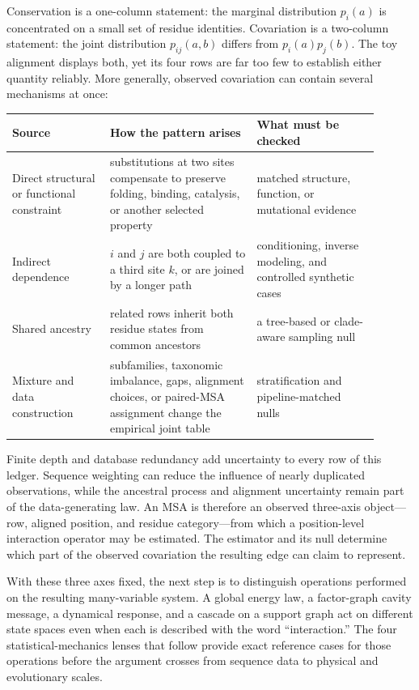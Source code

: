 Conservation is a one-column statement: the marginal distribution $p_i(a)$ is concentrated on a
small set of residue identities.  Covariation is a two-column statement: the joint distribution
$p_{ij}(a,b)$ differs from $p_i(a)p_j(b)$.  The toy alignment displays both, yet its four rows are
far too few to establish either quantity reliably.  More generally, observed covariation can
contain several mechanisms at once:
\begin{center}
\small
\begin{tabular}{@{}>{\raggedright\arraybackslash}p{0.24\linewidth}
                >{\raggedright\arraybackslash}p{0.36\linewidth}
                >{\raggedright\arraybackslash}p{0.30\linewidth}@{}}
\toprule
Source & How the pattern arises & What must be checked \\
\midrule
Direct structural or functional constraint & substitutions at two sites compensate to preserve
folding, binding, catalysis, or another selected property & matched structure, function, or
mutational evidence \\
Indirect dependence & $i$ and $j$ are both coupled to a third site $k$, or are joined by a longer
path & conditioning, inverse modeling, and controlled synthetic cases \\
Shared ancestry & related rows inherit both residue states from common ancestors & a tree-based or
clade-aware sampling null \\
Mixture and data construction & subfamilies, taxonomic imbalance, gaps, alignment choices, or
paired-MSA assignment change the empirical joint table & stratification and pipeline-matched nulls
\\
\bottomrule
\end{tabular}
\end{center}

Finite depth and database redundancy add uncertainty to every row of this ledger.  Sequence
weighting can reduce the influence of nearly duplicated observations, while the ancestral process
and alignment uncertainty remain part of the data-generating law.  An MSA is therefore an observed
three-axis object---row, aligned position, and residue category---from which a position-level
interaction operator may be estimated.  The estimator and its null determine which part of the
observed covariation the resulting edge can claim to represent.

With these three axes fixed, the next step is to distinguish operations performed on the resulting
many-variable system.  A global energy law, a factor-graph cavity message, a dynamical response,
and a cascade on a support graph act on different state spaces even when each is described with the
word ``interaction.''  The four statistical-mechanics lenses that follow provide exact reference
cases for those operations before the argument crosses from sequence data to physical and
evolutionary scales.
